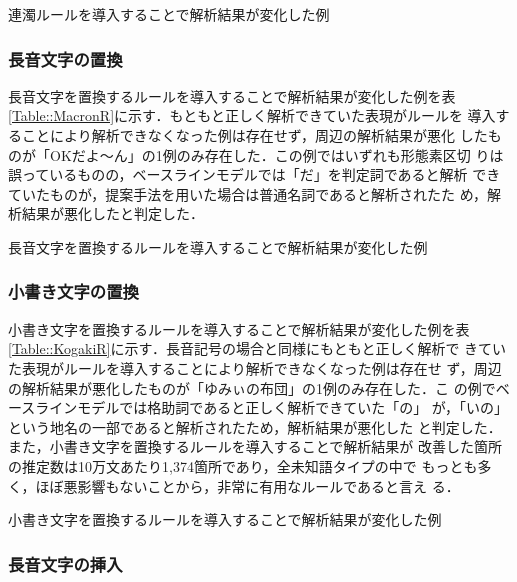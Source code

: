\documentclass[japanese]{jnlp_1.4}
\begin{document}
  \begin{table}[b]
   \caption{連濁ルールを導入することで解析結果が変化した例}
   \label{Table::Rendaku}

  \end{table}

  \subsubsection{長音文字の置換}

  長音文字を置換するルールを導入することで解析結果が変化した例を表
  \ref{Table::MacronR}に示す．もともと正しく解析できていた表現がルールを
  導入することにより解析できなくなった例は存在せず，周辺の解析結果が悪化
  したものが「OKだよ〜ん」の1例のみ存在した．この例ではいずれも形態素区切
  りは誤っているものの，ベースラインモデルでは「だ」を判定詞であると解析
  できていたものが，提案手法を用いた場合は普通名詞であると解析されたた
  め，解析結果が悪化したと判定した．

  \begin{table}[b]
   \caption{長音文字を置換するルールを導入することで解析結果が変化した例}
   \label{Table::MacronR}

  \end{table}


  \subsubsection{小書き文字の置換}

  小書き文字を置換するルールを導入することで解析結果が変化した例を表
  \ref{Table::KogakiR}に示す．長音記号の場合と同様にもともと正しく解析で
  きていた表現がルールを導入することにより解析できなくなった例は存在せ
  ず，周辺の解析結果が悪化したものが「ゆみぃの布団」の1例のみ存在した．こ
  の例でベースラインモデルでは格助詞であると正しく解析できていた「の」
  が，「いの」という地名の一部であると解析されたため，解析結果が悪化した
  と判定した．また，小書き文字を置換するルールを導入することで解析結果が
  改善した箇所の推定数は10万文あたり1,374箇所であり，全未知語タイプの中で
  もっとも多く，ほぼ悪影響もないことから，非常に有用なルールであると言え
  る．
  
  \begin{table}[b]
   \caption{小書き文字を置換するルールを導入することで解析結果が変化した例}
   \label{Table::KogakiR}

  \end{table}


  \subsubsection{長音文字の挿入}
\end{document}
